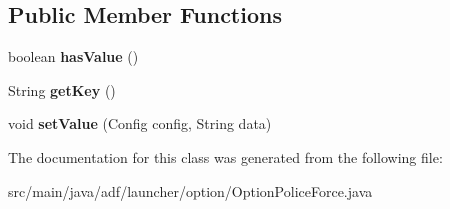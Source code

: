 \subsection*{Public Member Functions}
\begin{DoxyCompactItemize}
\item 
\hypertarget{classadf_1_1launcher_1_1option_1_1OptionPoliceForce_a64c467ee39986e68e271cb869f22b705}{}\label{classadf_1_1launcher_1_1option_1_1OptionPoliceForce_a64c467ee39986e68e271cb869f22b705} 
boolean {\bfseries has\+Value} ()
\item 
\hypertarget{classadf_1_1launcher_1_1option_1_1OptionPoliceForce_a93ad800e1f33ea5d7b03050400fc18a5}{}\label{classadf_1_1launcher_1_1option_1_1OptionPoliceForce_a93ad800e1f33ea5d7b03050400fc18a5} 
String {\bfseries get\+Key} ()
\item 
\hypertarget{classadf_1_1launcher_1_1option_1_1OptionPoliceForce_a48a866b41794becf1ec4d4b52fab7306}{}\label{classadf_1_1launcher_1_1option_1_1OptionPoliceForce_a48a866b41794becf1ec4d4b52fab7306} 
void {\bfseries set\+Value} (Config config, String data)
\end{DoxyCompactItemize}


The documentation for this class was generated from the following file\+:\begin{DoxyCompactItemize}
\item 
src/main/java/adf/launcher/option/Option\+Police\+Force.\+java\end{DoxyCompactItemize}
